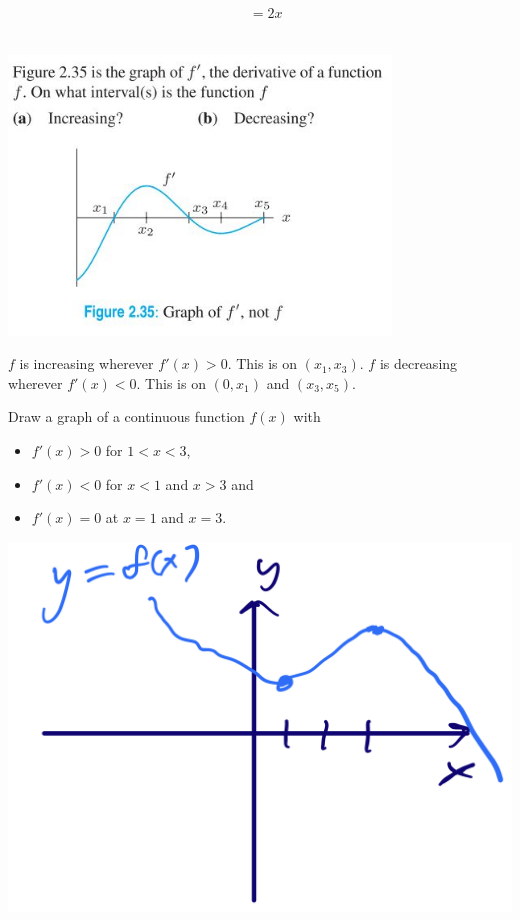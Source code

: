 \documentclass[11pt]{exam}
\begin{document}
\begin{questions}
\begin{solution}
\begin{align*}
        & = 2x
      \end{align*}
    \end{solution}
  \question \, \\
    \includegraphics[width=4in]{Figures/no43.jpg}
    \begin{solution}
      \(f\) is increasing wherever \(f'(x) > 0\). This is on
      \((x_1,x_3)\). \(f\) is decreasing wherever \(f'(x) < 0\). This
      is on \((0,x_1)\) and \((x_3,x_5)\).
    \end{solution}
  \question Draw a graph of a continuous function $f(x)$ with
	\begin{itemize}
		\item $f'(x)>0$ for $1<x<3$,
		\item $f'(x)<0$ for $x<1$ and $x>3$ and
		\item $f'(x)=0$ at $x=1$ and $x=3$.
	\end{itemize}
        \begin{solution}
         \includegraphics[scale=0.3]{Figures/no6sketch}

\end{solution}
\end{questions}
\end{document}
